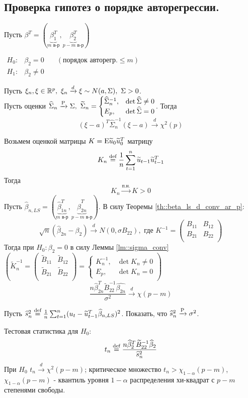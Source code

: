 \subsection{Проверка гипотез о порядке авторегрессии.}
Пусть $\beta^T=(\underbrace{\beta_1^T}_{m\text{ в-р}},\underbrace{\beta_2^T}_{p-m\text{ в-р}})$

\(
\begin{array}{ccc}
    H_0:& \beta_2=0& \quad (\text{порядок авторегр.}\leq m)\\
    H_1:& \beta_2\neq0&
\end{array}
\)
\begin{lemma} \label{lm::sigma_conv}
    Пусть $\xi_n,\xi\in\R^p,\ \xi_n\xrightarrow{d}\xi\sim N(a,\Sigma),\ \Sigma>0$. \\
    Пусть оценки
    \(\widehat{\Sigma}_n\xrightarrow{\P}\Sigma,\ 
      \widetilde{\Sigma}_n=\begin{cases}
        \widehat{\Sigma}^{-1}_n,& \det\widehat{\Sigma}\neq0 \\
        E_p,& \det\widehat{\Sigma}=0
    \end{cases}\).
    Тогда
    \[(\xi-a)^T\widehat{\Sigma}^{-1}_n(\xi-a)\xrightarrow{d}\chi^2(p)\]
\end{lemma}

Возьмем оценкой матрицы $K=\E\widetilde{u}_0\widetilde{u}_0^T$ матрицу
\[K_n\defeq\frac{1}{n}\sum_{t=1}^n\widetilde{u}_{t-1}\widetilde{u}_{t-1}^T\]
Тогда
\[K_n\xrightarrow{\text{п.н.}}K>0\]
Пусть $\widehat{\beta}_{n,LS}=(\underbrace{\widehat{\beta}_{1n}^T}_{m\text{ в-р}}, \underbrace{\widehat{\beta}_{2n}^T}_{p-m\text{ в-р}})$.
В силу Теоремы \ref{th::beta_ls_d_conv_ar_p}:
\[\sqrt{n}(\widehat{\beta}_{2n}-\beta_2)\xrightarrow{d}N(0,\sigma B_{22}),\text{ где } K^{-1}=\begin{pmatrix}
    B_{11} & B_{12} \\
    B_{21} & B_{22} \\
\end{pmatrix}\]
Тогда при $H_0:\beta_2=0$ в силу Леммы \ref{lm::sigma_conv} $\left(\widetilde{K}_n^{-1}=\begin{pmatrix}
    \widetilde{B}_{11} & \widetilde{B}_{12} \\
    \widetilde{B}_{21} & \widetilde{B}_{22} \\
\end{pmatrix} = \begin{cases}
    K_n^{-1},& \det K_n\neq0\\
    E_p,& \det K_n=0    
\end{cases}\right)$
\[\frac{n\widehat{\beta}^T_{2n}\widetilde{B}_{22}^{-1}\widehat{\beta_{2n}}}{\sigma^2}\xrightarrow{d}\chi(p-m)\]
\begin{task}
    Пусть $\widehat{s}_n^2\defeq\frac{1}{n}\sum_{t=1}^n(u_t-\widetilde{u}_{t-1}^T\widehat{\beta}_{n,LS})^2$.
    Показать, что $\widehat{s}_n^2\xrightarrow{\P}\sigma^2$.
\end{task}
Тестовая статистика для $H_0$:
\[t_n\defeq\frac{n\widehat{\beta}^T_2\widetilde{B}_{22}^{-1}\widehat{\beta}_2}{\widehat{s}_n^2}\]
При $H_0$ $t_n\xrightarrow{d}\chi^2(p-m)$; критическое множество $t_n>\chi_{1-\alpha}(p-m)$, $\chi_{1-\alpha}(p-m)$ - квантиль уровня $1-\alpha$
распределения хи-квадрат с $p-m$ степенями свободы.

